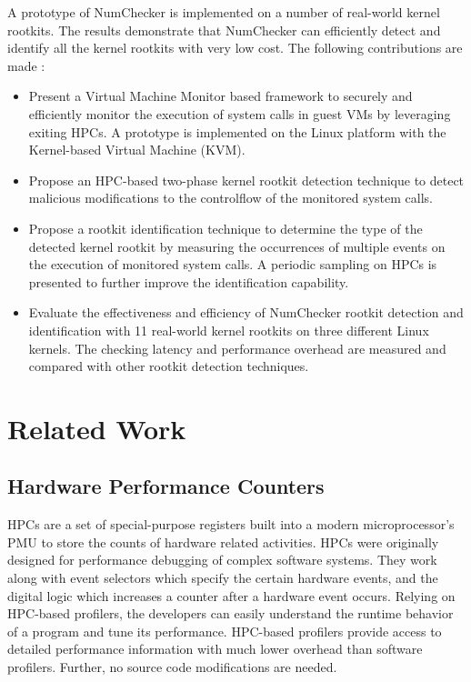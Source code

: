 \documentclass[12pt]{report}
\begin{document}
A prototype of NumChecker is implemented
on a number of real-world kernel rootkits. The results demonstrate
that NumChecker can efficiently detect and identify all
the kernel rootkits with very low cost. The following contributions are made :
\begin{itemize}
\item Present a Virtual Machine Monitor based framework to
securely and efficiently monitor the execution of system
calls in guest VMs by leveraging exiting HPCs. A prototype
is implemented on the Linux platform with the
Kernel-based Virtual Machine (KVM).

\item Propose an HPC-based two-phase kernel rootkit detection
technique to detect malicious modifications to the controlflow
of the monitored system calls.
\item Propose a rootkit identification technique to determine
the type of the detected kernel rootkit by measuring
the occurrences of multiple events on the execution of
monitored system calls. A periodic sampling on HPCs is
presented to further improve the identification capability.
\item Evaluate the effectiveness and efficiency of NumChecker
rootkit detection and identification with 11 real-world
kernel rootkits on three different Linux kernels. The
checking latency and performance overhead are measured
and compared with other rootkit detection techniques.
\end{itemize}

\chapter {Related Work}
\section{Hardware Performance Counters}
HPCs are a set of special-purpose registers built into a modern
microprocessor’s PMU to store the counts of hardware related
activities. HPCs were originally designed for performance
debugging of complex software systems. They work
along with event selectors which specify the certain hardware
events, and the digital logic which increases a counter after
a hardware event occurs. Relying on HPC-based profilers,
the developers can easily understand the runtime behavior
of a program and tune its performance. HPC-based profilers
provide access to detailed performance information with much
lower overhead than software profilers. Further, no source code
modifications are needed.
\end{document}
